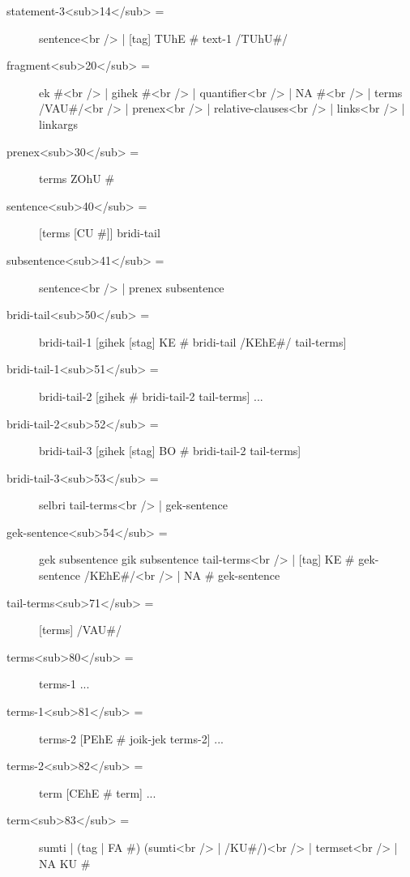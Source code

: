 \begin{description}
\hyperref[html:y14]{}
\item[statement-3<sub>14</sub> =] sentence<br /> | [tag] TUhE # text-1 /TUhU#/ \label{html:b20}
\hyperref[html:y20]{}
\item[fragment<sub>20</sub> =] ek #<br /> | gihek #<br /> | quantifier<br /> | NA #<br /> | terms /VAU#/<br /> | prenex<br /> | relative-clauses<br /> | links<br /> | linkargs \label{html:b30}
\hyperref[html:y30]{}
\item[prenex<sub>30</sub> =] terms ZOhU # \label{html:b40}
\hyperref[html:y40]{}
\item[sentence<sub>40</sub> =] [terms [CU #]] bridi-tail \label{html:b41}
\hyperref[html:y41]{}
\item[subsentence<sub>41</sub> =] sentence<br /> | prenex subsentence \label{html:b50}
\hyperref[html:y50]{}
\item[bridi-tail<sub>50</sub> =] bridi-tail-1 [gihek [stag] KE # bridi-tail /KEhE#/ tail-terms] \label{html:b51}
\hyperref[html:y51]{}
\item[bridi-tail-1<sub>51</sub> =] bridi-tail-2 [gihek # bridi-tail-2 tail-terms] ... \label{html:b52}
\hyperref[html:y52]{}
\item[bridi-tail-2<sub>52</sub> =] bridi-tail-3 [gihek [stag] BO # bridi-tail-2 tail-terms] \label{html:b53}
\hyperref[html:y53]{}
\item[bridi-tail-3<sub>53</sub> =] selbri tail-terms<br /> | gek-sentence \label{html:b54}
\hyperref[html:y54]{}
\item[gek-sentence<sub>54</sub> =] gek subsentence gik subsentence tail-terms<br /> | [tag] KE # gek-sentence /KEhE#/<br /> | NA # gek-sentence \label{html:b71}
\hyperref[html:y71]{}
\item[tail-terms<sub>71</sub> =] [terms] /VAU#/ \label{html:b80}
\hyperref[html:y80]{}
\item[terms<sub>80</sub> =] terms-1 ... \label{html:b81}
\hyperref[html:y81]{}
\item[terms-1<sub>81</sub> =] terms-2 [PEhE # joik-jek terms-2] ... \label{html:b82}
\hyperref[html:y82]{}
\item[terms-2<sub>82</sub> =] term [CEhE # term] ... \label{html:b83}
\hyperref[html:y83]{}
\item[term<sub>83</sub> =] sumti | (tag | FA #) (sumti<br /> | /KU#/)<br /> | termset<br /> | NA KU # \label{html:b85}

\end{description}
